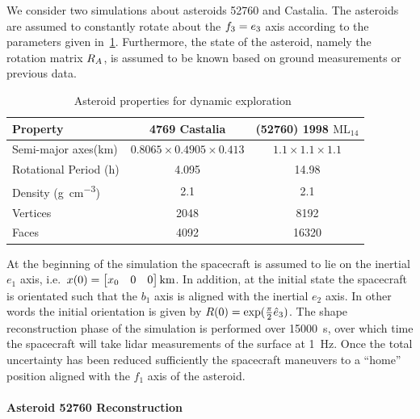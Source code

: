 We consider two simulations about asteroids \num{52760} and Castalia.
The asteroids are assumed to constantly rotate about the \( f_3 = e_3\) axis according to the parameters given in~\cref{tab:dynamic_asteroids}.
Furthermore, the state of the asteroid, namely the rotation matrix \( R_A \), is assumed to be known based on ground measurements or previous data.
\begin{table}[htbp]
    \centering
    \begin{tabular}{lcc}
        \toprule
        Property & \num{4769} Castalia & (\num{52760}) \num{1998} \(\text{ML}_{14}\) \\
        \midrule
        Semi-major axes(\si{\kilo\meter}) & \( 0.8065 \times 0.4905 \times 0.413 \) & \( 1.1 \times 1.1 \times 1.1 \) \\
        Rotational Period (\si{\hour}) & \num{4.095} & \num{14.98} \\
        Density (\si{\gram\per\centi\meter^3}) & \num{2.1} & \num{2.1} \\
        Vertices & \num{2048}  & \num{8192} \\
        Faces & \num{4092} & \num{16320} \\
        \bottomrule
    \end{tabular}
    \caption{Asteroid properties for dynamic exploration~\label{tab:dynamic_asteroids}}
\end{table}
At the beginning of the simulation the spacecraft is assumed to lie on the inertial \( e_1 \) axis, i.e.\ \( x(0) = \begin{bmatrix} x_0 & 0 & 0 \end{bmatrix} \si{\kilo\meter} \).
In addition, at the initial state the spacecraft is orientated such that the \( b_1 \) axis is aligned with the inertial \( e_2 \) axis.
In other words the initial orientation is given by \( R(0) = \exp(\frac{\pi}{2} \hat{e}_3)\).
The shape reconstruction phase of the simulation is performed over \SI{15000}{\second}, over which time the spacecraft will take \gls{lidar} measurements of the surface at \SI{1}{\hertz}.
Once the total uncertainty has been reduced sufficiently the spacecraft maneuvers to a ``home'' position aligned with the \( f_1 \) axis of the asteroid.

\paragraph{Asteroid 52760 Reconstruction}

